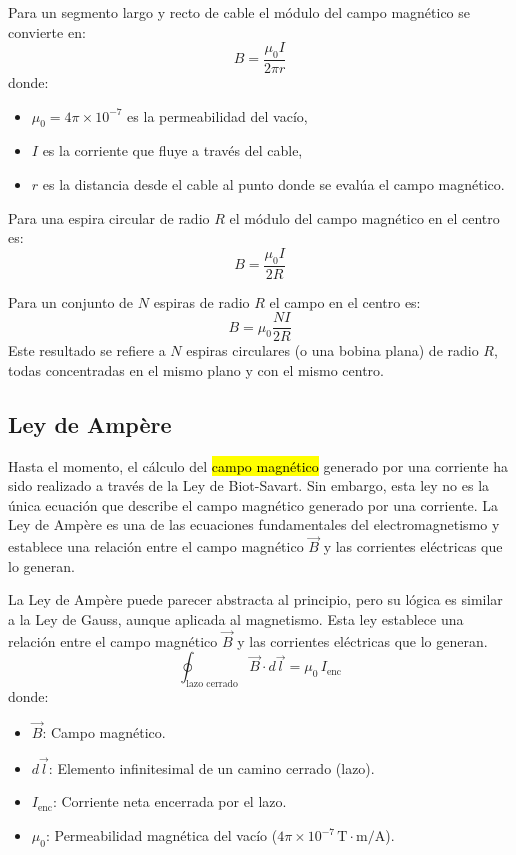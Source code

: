 Para un segmento largo y recto de cable el módulo del campo magnético se convierte en:
\begin{equation*}
  B = \frac{\mu_0 I}{2\pi r}
\end{equation*}
donde:
\begin{itemize}
  \item \(\mu_0 = 4 \pi \times 10^{-7}\) es la permeabilidad del vacío,
  \item \(I\) es la corriente que fluye a través del cable,
  \item \(r\) es la distancia desde el cable al punto donde se evalúa el campo magnético.
\end{itemize}

\noindent Para una espira circular de radio \(R\) el módulo del campo magnético en el centro es:
\begin{equation*}
  B = \frac{\mu_0 I}{2R}
\end{equation*}

\noindent Para un conjunto de \(N\) espiras de radio \(R\) el campo en el centro es:
\begin{equation*}
  B = \mu_0 \frac{N I}{2R}
\end{equation*}
Este resultado se refiere a \(N\) espiras circulares (o una bobina plana) de radio \(R\), todas concentradas en el mismo plano y con el mismo centro.

\subsection{Ley de Ampère}

Hasta el momento, el cálculo del \hl{campo magnético} generado por una corriente ha sido realizado a través de la Ley de Biot-Savart. Sin embargo, esta ley no es la única ecuación que describe el campo magnético generado por una corriente. La Ley de Ampère es una de las ecuaciones fundamentales del electromagnetismo y establece una relación entre el campo magnético \(\vec{B}\) y las corrientes eléctricas que lo generan. 

La Ley de Ampère puede parecer abstracta al principio, pero su lógica es similar a la Ley de Gauss, aunque aplicada al magnetismo. Esta ley establece una relación entre el campo magnético \(\vec{B}\) y las corrientes eléctricas que lo generan. 
\[
\oint_{\text{lazo cerrado}} \vec{B} \cdot d\vec{l} = \mu_0 \, I_{\text{enc}}
\]
donde:
\begin{itemize}
  \item \(\vec{B}\): Campo magnético.
  \item \(d\vec{l}\): Elemento infinitesimal de un camino cerrado (lazo).
  \item \(I_{\text{enc}}\): Corriente neta encerrada por el lazo.
  \item \(\mu_0\): Permeabilidad magnética del vacío (\(4\pi \times 10^{-7} \, \mathrm{T \cdot m/A}\)).
\end{itemize}

